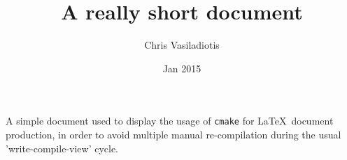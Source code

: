 \documentclass{article}
\title{A really short document}
\author{Chris Vasiladiotis}
\date{Jan 2015}
\begin{document}
\maketitle

A simple document used to display the usage of {\tt cmake}  for \LaTeX\ document production,
in order to avoid multiple manual re-compilation during the usual 'write-compile-view' cycle.
\end{document}
